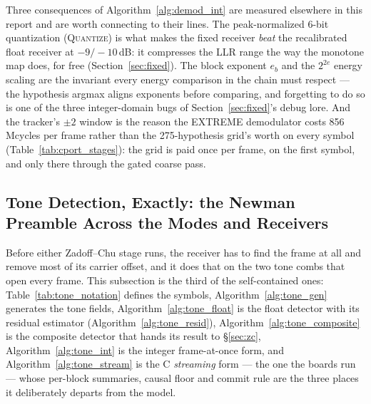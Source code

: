 Three consequences of Algorithm~\ref{alg:demod_int} are measured
elsewhere in this report and are worth connecting to their lines.  The
peak-normalized 6-bit quantization (\textsc{Quantize}) is what makes
the fixed receiver \emph{beat} the recalibrated float receiver at
$-9/-10$\,dB: it compresses the LLR range the way the monotone map
does, for free (Section~\ref{sec:fixed}).  The block exponent
$e_b$ and the $2^{2e}$ energy scaling are the invariant every energy
comparison in the chain must respect --- the hypothesis argmax
aligns exponents before comparing, and forgetting to do so is
one of the three integer-domain bugs of Section~\ref{sec:fixed}'s debug
lore.  And the tracker's $\pm 2$ window is the reason the EXTREME
demodulator costs 856\,Mcycles per frame rather than the 275-hypothesis
grid's worth on every symbol (Table~\ref{tab:cport_stages}): the grid is
paid once per frame, on the first symbol, and only there through the
gated coarse pass.

\subsection{Tone Detection, Exactly: the Newman Preamble Across the Modes and Receivers}
\label{sec:tone_exact}

Before either Zadoff--Chu stage runs, the receiver has to find the
frame at all and remove most of its carrier offset, and it does that
on the two tone combs that open every frame.  This subsection is the
third of the self-contained ones: Table~\ref{tab:tone_notation} defines
the symbols, Algorithm~\ref{alg:tone_gen} generates the tone fields,
Algorithm~\ref{alg:tone_float} is the float detector with its residual
estimator (Algorithm~\ref{alg:tone_resid}), Algorithm~\ref{alg:tone_composite}
is the composite detector that hands its result to \S\ref{sec:zc},
Algorithm~\ref{alg:tone_int} is the integer frame-at-once form, and
Algorithm~\ref{alg:tone_stream} is the C \emph{streaming} form --- the
one the boards run --- whose per-block summaries, causal floor and
commit rule are the three places it deliberately departs from the
model.

